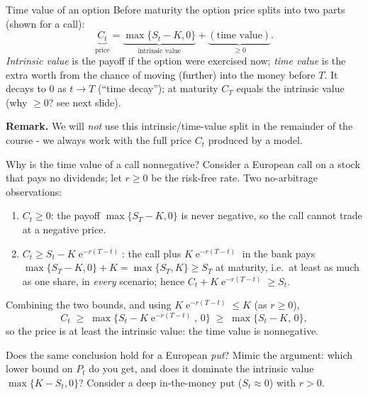 \documentclass[pdf, handout]{beamer}
\newcommand{\e}{\operatorname{e}}
\begin{document}
\begin{frame}{Time value of an option}
Before maturity the option price splits into two parts (shown for a call):
\[
\underbrace{C_t}_{\text{price}}=\underbrace{\max\{S_t-K,0\}}_{\text{intrinsic value}}+\underbrace{(\text{time value})}_{\geq 0}.
\]
\emph{Intrinsic value} is the payoff if the option were exercised now; \emph{time value} is the extra worth from the chance of moving (further) into the money before $T$. It decays to $0$ as $t\to T$ (``time decay''); at maturity $C_T$ equals the intrinsic value (why $\geq 0$? see next slide).
\begin{center}
\end{center}
\textbf{Remark.} We will \emph{not} use this intrinsic/time-value split in the remainder of the course - we always work with the full price $C_t$ produced by a model.
\end{frame}

\begin{frame}{Why is the time value of a call nonnegative?}
\small
Consider a European call on a stock that pays no dividends; let $r\geq 0$ be the risk-free rate. Two no-arbitrage observations:
\begin{enumerate}
\item $C_t\geq 0$: the payoff $\max\{S_T-K,0\}$ is never negative, so the call cannot trade at a negative price.
\item $C_t\geq S_t-K\e^{-r(T-t)}$: the call plus $K\e^{-r(T-t)}$ in the bank pays $\max\{S_T-K,0\}+K=\max\{S_T,K\}\geq S_T$ at maturity, i.e.\ at least as much as one share, in \emph{every} scenario; hence $C_t+K\e^{-r(T-t)}\geq S_t$.
\end{enumerate}
Combining the two bounds, and using $K\e^{-r(T-t)}\leq K$ (as $r\geq 0$),
\[
C_t\;\geq\;\max\bigl\{S_t-K\e^{-r(T-t)},\,0\bigr\}\;\geq\;\max\{S_t-K,\,0\},
\]
so the price is at least the intrinsic value: the time value is nonnegative.
\begin{fftbox}
Does the same conclusion hold for a European \emph{put}? Mimic the argument: which lower bound on $P_t$ do you get, and does it dominate the intrinsic value $\max\{K-S_t,0\}$? Consider a deep in-the-money put ($S_t\approx 0$) with $r>0$.
\end{fftbox}
\end{frame}
\end{document}
